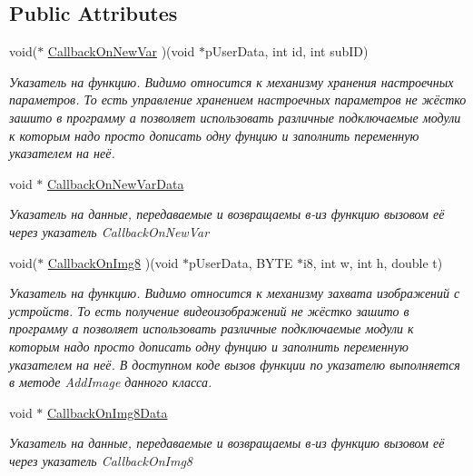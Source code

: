 \subsection*{Public Attributes}
\begin{DoxyCompactItemize}
\item 
void($\ast$ \hyperlink{class_c_v_i_engine_base_ab3883b66e78478803c693b4ad2f5b0e7}{Callback\+On\+New\+Var} )(void $\ast$p\+User\+Data, int id, int sub\+I\+D)
\begin{DoxyCompactList}\small\item\em Указатель на функцию. Видимо относится к механизму хранения настроечных параметров. То есть управление хранением настроечных параметров не жёстко зашито в программу а позволяет использовать различные подключаемые модули к которым надо просто дописать одну фунцию и заполнить переменную указателем на неё. \end{DoxyCompactList}\item 
void $\ast$ \hyperlink{class_c_v_i_engine_base_aa0d4e70811444be165a4b9c2a4aa7aae}{Callback\+On\+New\+Var\+Data}
\begin{DoxyCompactList}\small\item\em Указатель на данные, передаваемые и возвращаемы в-\/из функцию вызовом её через указатель Callback\+On\+New\+Var \end{DoxyCompactList}\item 
void($\ast$ \hyperlink{class_c_v_i_engine_base_a4f0ddf3af6a98c243d97cbcc9be38e18}{Callback\+On\+Img8} )(void $\ast$p\+User\+Data, B\+Y\+T\+E $\ast$i8, int w, int h, double t)
\begin{DoxyCompactList}\small\item\em Указатель на функцию. Видимо относится к механизму захвата изображений с устройств. То есть получение видеоизображений не жёстко зашито в программу а позволяет использовать различные подключаемые модули к которым надо просто дописать одну фунцию и заполнить переменную указателем на неё. В доступном коде вызов функции по указателю выполняется в методе Add\+Image данного класса. \end{DoxyCompactList}\item 
void $\ast$ \hyperlink{class_c_v_i_engine_base_abfaf1ec8dec9a82c896a90c708dfd756}{Callback\+On\+Img8\+Data}
\begin{DoxyCompactList}\small\item\em Указатель на данные, передаваемые и возвращаемы в-\/из функцию вызовом её через указатель Callback\+On\+Img8 \end{DoxyCompactList}\item 

\end{DoxyCompactItemize}

